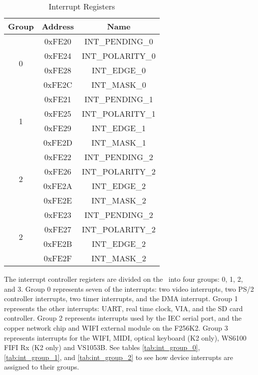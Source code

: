 \begin{table}[ht]
	\begin{center}
		\begin{tabular}{|c|c|c|} \hline
            Group & Address & Name \\ \hline\hline
            \multirow{4}{*}{0} & 0xFE20 & INT\_PENDING\_0 \\ \cline{2-3}
                               & 0xFE24 & INT\_POLARITY\_0 \\ \cline{2-3}
                               & 0xFE28 & INT\_EDGE\_0 \\ \cline{2-3}
                               & 0xFE2C & INT\_MASK\_0 \\ \hline\hline

            \multirow{4}{*}{1} & 0xFE21 & INT\_PENDING\_1 \\ \cline{2-3}
                               & 0xFE25 & INT\_POLARITY\_1 \\ \cline{2-3}
                               & 0xFE29 & INT\_EDGE\_1 \\ \cline{2-3}
                               & 0xFE2D & INT\_MASK\_1 \\ \hline\hline

            \multirow{4}{*}{2} & 0xFE22 & INT\_PENDING\_2 \\ \cline{2-3}
                               & 0xFE26 & INT\_POLARITY\_2 \\ \cline{2-3}
                               & 0xFE2A & INT\_EDGE\_2 \\ \cline{2-3}
                               & 0xFE2E & INT\_MASK\_2 \\ \hline
            \multirow{4}{*}{2} & 0xFE23 & INT\_PENDING\_2 \\ \cline{2-3}
                               & 0xFE27 & INT\_POLARITY\_2 \\ \cline{2-3}
                               & 0xFE2B & INT\_EDGE\_2 \\ \cline{2-3}
                               & 0xFE2F & INT\_MASK\_2 \\ \hline
        \end{tabular}
    \end{center}
	\caption{Interrupt Registers}
	\label{tab:int_reg}
\end{table}

The interrupt controller registers are divided on the \jr\ into four groups: 0, 1, 2, and 3. Group 0 represents seven of the interrupts: two video interrupts, two PS/2 controller interrupts, two timer interrupts, and the DMA interrupt. Group 1 represents the other interrupts: UART, real time clock, VIA, and the SD card controller. Group 2 represents interrupts used by the IEC serial port, and the copper network chip and WIFI external module on the F256K2. Group 3 represents interrupts for the WIFI, MIDI, optical keyboard (K2 only), WS6100 FIFI Rx (K2 only) and VS1053B.  See tables \ref{tab:int_group_0}, \ref{tab:int_group_1}, and \ref{tab:int_group_2} to see how device interrupts are assigned to their groups.

